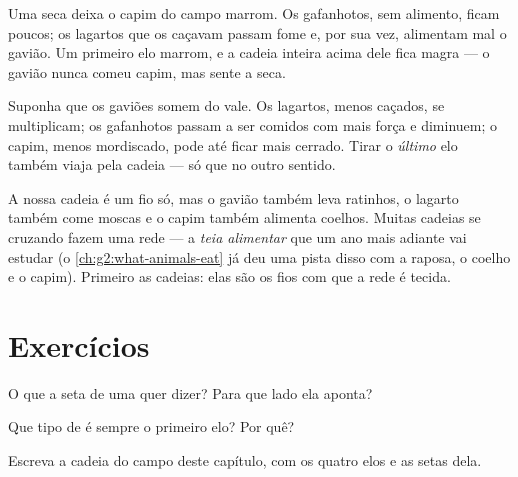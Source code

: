 \begin{example}\label{ex:g3:food-chains:dry}
Uma seca deixa o capim do campo marrom. Os gafanhotos, sem alimento,
ficam poucos; os lagartos que os caçavam passam fome e, por sua vez,
alimentam mal o gavião. Um primeiro elo marrom, e a cadeia inteira
acima dele fica magra --- o gavião nunca comeu capim, mas sente a
seca.
\end{example}

\begin{example}\label{ex:g3:food-chains:hunter}
Suponha que os gaviões somem do vale. Os lagartos, menos caçados, se
multiplicam; os gafanhotos passam a ser comidos com mais força e
diminuem; o capim, menos mordiscado, pode até ficar mais cerrado.
Tirar o \emph{último} elo também viaja pela cadeia --- só que no
outro sentido.
\end{example}

\begin{remark}\label{rem:g3:food-chains:web}
A nossa cadeia é um fio só, mas o gavião também leva ratinhos, o
lagarto também come moscas e o capim também alimenta coelhos. Muitas
cadeias se cruzando fazem uma rede --- a \emph{teia alimentar} que
um ano mais adiante vai estudar (o
\cref{ch:g2:what-animals-eat} já deu uma pista disso com a raposa, o
coelho e o capim). Primeiro as cadeias: elas são os fios com que a
rede é tecida.
\end{remark}

\section{Exercícios}

\begin{exercise}[$\star$]\label{exo:g3:food-chains:1}
O que a seta de uma  quer dizer? Para que lado ela
aponta?
\end{exercise}

\begin{exercise}[$\star$]\label{exo:g3:food-chains:2}
Que tipo de  é sempre o primeiro elo? Por quê?
\end{exercise}

\begin{exercise}[$\star$]\label{exo:g3:food-chains:3}
Escreva a cadeia do campo deste capítulo, com os quatro elos e as
setas dela.
\end{exercise}

